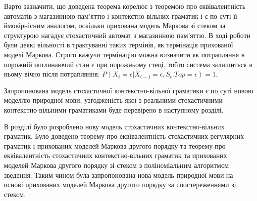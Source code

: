 Варто зазначити, що доведена теорема корелює з теоремою про еквівалентність автоматів з магазинною пам'яттю і контекстно-вільних граматик і є по суті її ймовірнісним аналогом, оскільки прихована модель Маркова зі стеком за структурою нагадує стохастичний автомат з магазинною пам'яттю. В ході роботи були деякі вільності в трактуванні таких термінів, як термінація прихованої моделі Маркова. Строго кажучи термінацію можна визначити як потрапляння в порожній поглинаючий стан $\epsilon$ при порожньому стеці, тобто система залишиться в ньому вічно після потрапляння: $ P(X_t = \epsilon | X_{t-1} = \epsilon, S_t.Top = \epsilon) = 1 $.

Запропонована модель стохастичної контекстно-вільної граматики є по суті новою моделлю природної мови, узгодженість якої з реальними стохастичними контекстно-вільними граматиками буде перевірено в наступному розділі.

\chapconclude{\ref{chap:theory}}
В розділі було розроблено нову модель стохастичних контекстно-вільних граматик. Було доведено теорему про еквівалентність стохастичних регулярних граматик і прихованих моделей Маркова другого порядку та теорему про еквівалентність стохастичних контекстно-вільних граматик та прихованих моделей Маркова другого порядку зі стеком з поліноміальним алгоритмом зведення. Таким чином була запропонована нова модель природної мови на основі прихованих моделей Маркова другого порядку за спостереженнями зі стеком.
